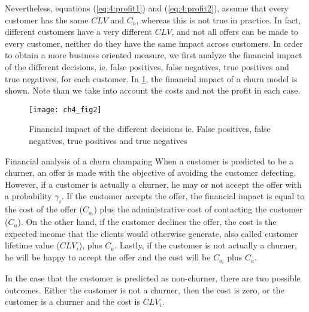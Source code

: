 Nevertheless, equations (\ref{eq:4:profit1}) and (\ref{eq:4:profit2}), assume that every customer 
has the same $CLV$ and $C_o$, whereas this is not true in practice. In fact, different customers 
have a very different $CLV$, and not all offers can be made to every customer, neither do they have 
the same impact across customers. In order to obtain a more business oriented measure, we first 
analyze the financial impact of the different decisions, ie. false positives, false negatives, true 
positives and true negatives, for each customer.	In \figurename{ \ref{fig:ch4:2}}, the financial 
impact of a churn model is shown. Note than we take into account the costs and not the profit in 
each case.

\begin{figure}[htbp]
  \centering
  \texttt{[image: ch4\_fig2]}
  \caption{Financial impact of the different decisions ie. False positives, false negatives, 
  true 	positives and true negatives}
	\label{fig:ch4:2}
\end{figure}

\begin{remark}{Financial analysis of a churn champaing}
When a customer is predicted to be a churner, an offer is made with the objective of avoiding 
the customer defecting. However, if a customer is actually a churner, he may or not accept the 
offer with a probability $\gamma_i$. If the customer accepts the offer, the financial impact is 
equal to the cost of the offer ($C_{o_i}$) plus the administrative cost of contacting the 
customer ($C_a$). On the other hand, if the customer declines the offer, the cost is the 
expected 	income that the clients would otherwise generate, also called customer lifetime value 
($CLV_i$), 	plus $C_a$. Lastly, if the customer is not actually a churner, he will be happy to 
accept the 	offer and the cost will be $C_{o_i}$ plus $C_a$.
	
In the case that the customer is predicted as non-churner, there are two possible outcomes. 
Either the customer is not a churner, then the cost is zero, or the customer is a churner and the 
cost is $CLV_i$. 
\end{remark}

